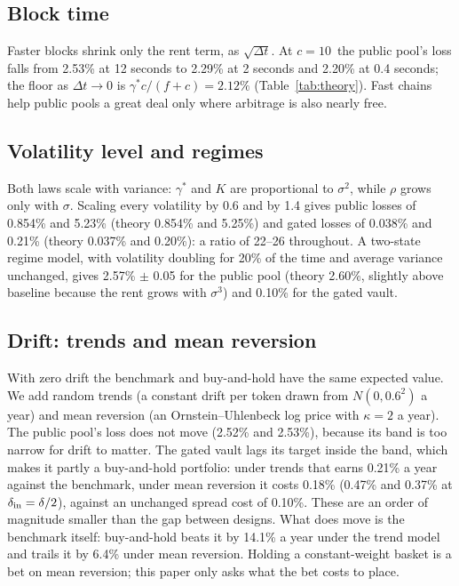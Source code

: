 \subsection{Block time}
Faster blocks shrink only the rent term, as $\sqrt{\Delta t}$. At $c=10$\bps\ the public pool's loss falls from 2.53\% at 12 seconds to 2.29\% at 2 seconds and 2.20\% at 0.4 seconds; the floor as $\Delta t\to0$ is $\gamma^{*}c/(f+c)=2.12\%$ (Table~\ref{tab:theory}). Fast chains help public pools a great deal only where arbitrage is also nearly free.

\subsection{Volatility level and regimes}
Both laws scale with variance: $\gamma^{*}$ and $K$ are proportional to $\sigma^2$, while $\rho$ grows only with $\sigma$. Scaling every volatility by 0.6 and by 1.4 gives public losses of 0.854\% and 5.23\% (theory 0.854\% and 5.25\%) and gated losses of 0.038\% and 0.21\% (theory 0.037\% and 0.20\%): a ratio of 22--26 throughout. A two-state regime model, with volatility doubling for 20\% of the time and average variance unchanged, gives 2.57\% $\pm$ 0.05 for the public pool (theory 2.60\%, slightly above baseline because the rent grows with $\sigma^3$) and 0.10\% for the gated vault.

\subsection{Drift: trends and mean reversion}
\label{sec:drift}
With zero drift the benchmark and buy-and-hold have the same expected value. We add random trends (a constant drift per token drawn from $N(0,0.6^2)$ a year) and mean reversion (an Ornstein--Uhlenbeck log price with $\kappa=2$ a year). The public pool's loss does not move (2.52\% and 2.53\%), because its band is too narrow for drift to matter. The gated vault lags its target inside the band, which makes it partly a buy-and-hold portfolio: under trends that earns 0.21\% a year against the benchmark, under mean reversion it costs 0.18\% (0.47\% and 0.37\% at $\delta_{\mathrm{in}}=\delta/2$), against an unchanged spread cost of 0.10\%. These are an order of magnitude smaller than the gap between designs. What does move is the benchmark itself: buy-and-hold beats it by 14.1\% a year under the trend model and trails it by 6.4\% under mean reversion. Holding a constant-weight basket is a bet on mean reversion; this paper only asks what the bet costs to place.

